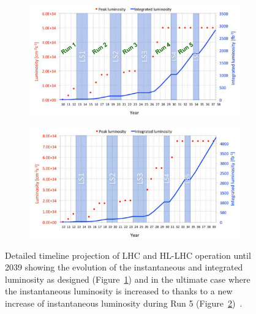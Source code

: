 	\begin{figure}[H]
		\begin{subfigure}{\linewidth}
			\centering
			\includegraphics[width=\plotwidth]{fig/chapt2/HL-LHC-nominal.png}
			\caption{\label{fig:HL-LHC-Timeline:A}}
		\end{subfigure}
		\begin{subfigure}{\linewidth}
			\centering
			\includegraphics[width=\plotwidth]{fig/chapt2/HL-LHC-ultimate.png}
			\caption{\label{fig:HL-LHC-Timeline:B}}
		\end{subfigure}
		\caption{\label{fig:HL-LHC-Timeline} Detailed timeline projection of LHC and HL-LHC operation until 2039 showing the evolution of the instantaneous and integrated luminosity as designed (Figure~\ref{fig:HL-LHC-Timeline:A}) and in the ultimate case where the instantaneous luminosity is increased to \siflux thanks to a new increase of instantaneous luminosity during Run 5 (Figure~\ref{fig:HL-LHC-Timeline:B})~\cite{HLLHC2017,HLLHCPDR,PHASEIITP}.}
	\end{figure}
	
